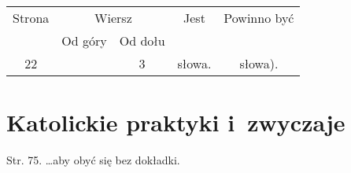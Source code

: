 \documentclass[a4paper,11pt]{article}
\begin{document}
\begin{center}

  \begin{tabular}{|c|c|c|c|c|}
    \hline
    Strona & \multicolumn{2}{c|}{Wiersz} & Jest
                              & Powinno być \\ \cline{2-3}
    & Od góry & Od dołu & & \\
    \hline
    22  & &  3 & słowa. & słowa). \\
    \hline
  \end{tabular}

\end{center}














\newpage

\section{Katolickie praktyki i~zwyczaje}

\vspace{\spaceTwo}







Str. 75. \ldots aby obyć się bez dokładki.
\end{document}
